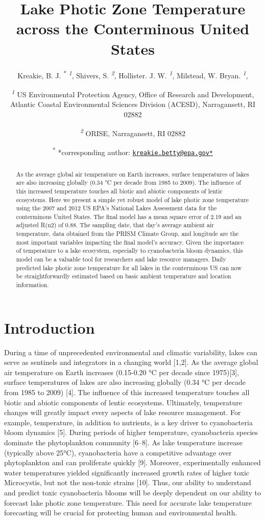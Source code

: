 \documentclass[
]{article}
\title{Lake Photic Zone Temperature across the Conterminous United States}
\author{Kreakie, B. J. \textsuperscript{*} \textsuperscript{\emph{1}}, Shivers,
S. \textsuperscript{\emph{2}}, Hollister. J. W.
\textsuperscript{\emph{1}}, Milstead, W. Bryan.
\textsuperscript{\emph{1}}, \and \textsuperscript{\emph{1}} US Environmental Protection Agency, Office of
Research and Development, Atlantic Coastal Environmental Sciences
Division (ACESD), Narragansett, RI 02882 \and \textsuperscript{\emph{2}} ORISE, Narragansett, RI 02882 \and \textsuperscript{*} *corresponding author:
\href{mailto:kreakie.betty@epa.gov*}{\nolinkurl{kreakie.betty@epa.gov*}}}
\date{}
\begin{document}
\maketitle
\begin{abstract}
As the average global air temperature on Earth increases, surface
temperatures of lakes are also increasing globally (0.34 °C per decade
from 1985 to 2009). The influence of this increased temperature touches
all biotic and abiotic components of lentic ecosystems. Here we present
a simple yet robust model of lake photic zone temperature using the 2007
and 2012 US EPA's National Lakes Assessment data for the conterminous
United States. The final model has a mean square error of 2.19 and an
adjusted R(n2) of 0.88. The sampling date, that day's average ambient
air temperature, data obtained from the PRISM Climate Group, and
longitude are the most important variables impacting the final model's
accuracy. Given the importance of temperature to a lake ecosystem,
especially to cyanobacteria bloom dynamics, this model can be a valuable
tool for researchers and lake resource managers. Daily predicted lake
photic zone temperature for all lakes in the conterminous US can now be
straightforwardly estimated based on basic ambient temperature and
location information.
\end{abstract}

\hypertarget{introduction}{%
\section{Introduction}\label{introduction}}

During a time of unprecedented environmental and climatic variability,
lakes can serve as sentinels and integrators in a changing world
{[}1,2{]}. As the average global air temperature on Earth increases
(0.15-0.20 °C per decade since 1975){[}3{]}, surface temperatures of
lakes are also increasing globally (0.34 °C per decade from 1985 to
2009) {[}4{]}. The influence of this increased temperature touches all
biotic and abiotic components of lentic ecosystems. Ultimately,
temperature changes will greatly impact every aspects of lake resource
management. For example, temperature, in addition to nutrients, is a key
driver to cyanobacteria bloom dynamics {[}5{]}. During periods of higher
temperature, cyanobacteria species dominate the phytoplankton community
{[}6--8{]}. As lake temperature increase (typically above 25°C),
cyanobacteria have a competitive advantage over phytoplankton and can
proliferate quickly {[}9{]}. Moreover, experimentally enhanced water
temperatures yielded significantly increased growth rates of higher
toxic Microcystis, but not the non-toxic strains {[}10{]}. Thus, our
ability to understand and predict toxic cyanobacteria blooms will be
deeply dependent on our ability to forecast lake photic zone
temperature. This need for accurate lake temperature forecasting will be
crucial for protecting human and environmental health.
\end{document}
